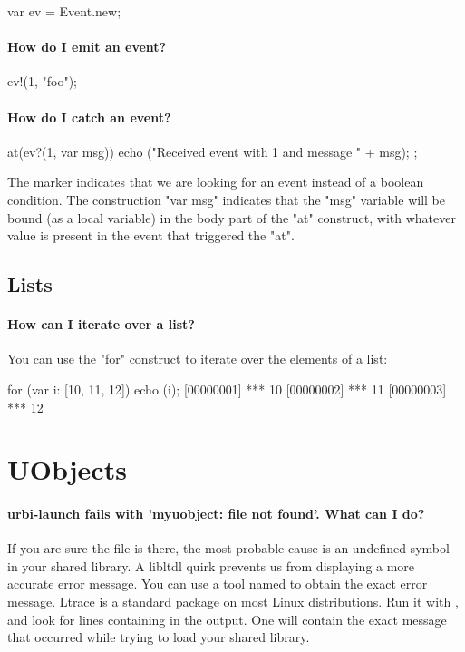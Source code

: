 \begin{urbifixme}
var ev = Event.new;
\end{urbifixme}

\paragraph{How do I emit an event?}
\begin{urbifixme}
ev!(1, "foo");
\end{urbifixme}

\paragraph{How do I catch an event?}
\begin{urbifixme}
at(ev?(1, var msg)) {
  echo ("Received event with 1 and message " + msg);
};
\end{urbifixme}

The  marker indicates that we are looking for an event instead of a
boolean condition. The construction "var msg" indicates that the "msg"
variable will be bound (as a local variable) in the body part of the "at"
construct, with whatever value is present in the event that triggered the
"at".

\subsection{Lists}
\paragraph{How can I iterate over a list?}

You can use the "for" construct to iterate over the elements of a list:

\begin{urbiscript}
for (var i: [10, 11, 12]) echo (i);
[00000001] *** 10
[00000002] *** 11
[00000003] *** 12
\end{urbiscript}


\section{UObjects}

\paragraph{urbi-launch fails with 'myuobject: file not found'. What can I do?}
If you are sure the file is there, the most probable cause is an
undefined symbol in your shared library. A libltdl quirk prevents us
from displaying a more accurate error message.  You can use a tool
named  to obtain the exact error message.  Ltrace is a
standard package on most Linux distributions.  Run it with
, and look for lines
containing  in the output. One will contain the exact
message that occurred while trying to load your shared library.

